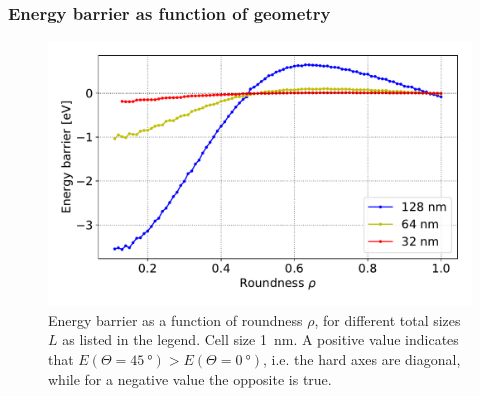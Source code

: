\documentclass[11pt,a4paper,english]{article}
\begin{document}
\subsubsection{Energy barrier as function of geometry}
\begin{figure}
    \centering
    \includegraphics[width=0.9\columnwidth]{Figures/biaxial_island/Barrier/Plus_32,64,128_0.1-1_aPi128_B0.01_cell1nm.pdf}
    \caption{Energy barrier as a function of roundness $\rho$, for different total sizes $L$ as listed in the legend. Cell size \SI{1}{\nano\metre}. A positive value indicates that $E(\Theta=\SI{45}{\degree}) > E(\Theta=\SI{0}{\degree})$, i.e. the hard axes are diagonal, while for a negative value the opposite is true.}
    \label{fig:barrier-cell_size}
\end{figure}
\end{document}
